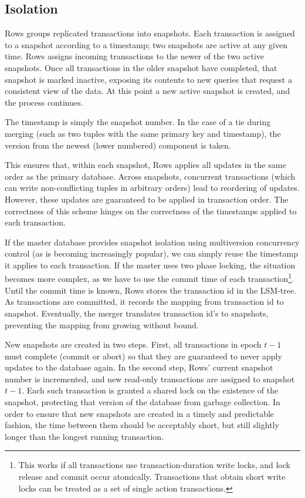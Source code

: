 \documentclass{sig-alternate-sigmod08}
\newcommand{\rows}{Rows\xspace}
\newcommand{\rowss}{Rows'\xspace}
\begin{document}
\subsection{Isolation}
\label{sec:isolation}
\rows groups replicated transactions into snapshots.  Each transaction
is assigned to a snapshot according to a timestamp; two snapshots are
active at any given time.  \rows assigns incoming transactions to the
newer of the two active snapshots.  Once all transactions in the older
snapshot have completed, that snapshot is marked inactive, exposing
its contents to new queries that request a consistent view of the
data.  At this point a new active snapshot is created, and the process
continues.

The timestamp is simply the snapshot number.  In the case of a tie
during merging (such as two tuples with the same primary key and
timestamp), the version from the newest (lower numbered) component is
taken.

This ensures that, within each snapshot, \rows applies all updates in the
same order as the primary database.  Across snapshots, concurrent
transactions (which can write non-conflicting tuples in arbitrary
orders) lead to reordering of updates.  However, these updates are
guaranteed to be applied in transaction order.  The correctness of
this scheme hinges on the correctness of the timestamps applied to
each transaction.

If the master database provides snapshot isolation using multiversion
concurrency control (as is becoming increasingly popular), we can
simply reuse the timestamp it applies to each transaction.  If the
master uses two phase locking, the situation becomes more complex, as
we have to use the commit time of each transaction\footnote{This works
  if all transactions use transaction-duration write locks, and lock
  release and commit occur atomically.  Transactions that obtain short
  write locks can be treated as a set of single action transactions.}.
Until the commit time is known, \rows stores the transaction id in the
LSM-tree.  As transactions are committed, it records the mapping from
transaction id to snapshot.  Eventually, the merger translates
transaction id's to snapshots, preventing the mapping from growing
without bound.

New snapshots are created in two steps.  First, all transactions in
epoch $t-1$ must complete (commit or abort) so that they are
guaranteed to never apply updates to the database again.  In the
second step, \rowss current snapshot number is incremented, and new
read-only transactions are assigned to snapshot $t-1$.  Each such
transaction is granted a shared lock on the existence of the snapshot,
protecting that version of the database from garbage collection.  In
order to ensure that new snapshots are created in a timely and
predictable fashion, the time between them should be acceptably short,
but still slightly longer than the longest running transaction.
\end{document}
